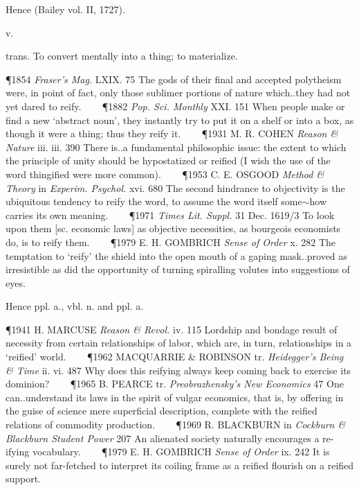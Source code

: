 \begin{description}[wide, labelwidth=!, labelindent=0pt]
\begin{myenumerate}
\noindent Hence  (Bailey vol. II, 1727).
\end{myenumerate}

 v.

\noindent {}

\vspace{-0.3cm}

trans. To convert mentally into a thing; to materialize.

\P 1854  \textit{Fraser's Mag.} LXIX. 75 The gods of their final and accepted polytheism were, in point of fact, only those sublimer portions of nature which..they had not yet dared to reify.    
\P 1882 \textit{Pop.  Sci. Monthly} XXI. 151 When people make or find a new ‘abstract noun’, they instantly try to put it on a shelf or into a box, as though it were a thing; thus they reify it.    
\P 1931 M. R. COHEN  \textit{Reason \& Nature} iii. iii. 390 There is..a fundamental philosophic issue: the extent to which the principle of unity should be hypostatized or reified (I wish the use of the word thingified were more common).    
\P 1953 C. E. OSGOOD  \textit{Method \& Theory} in \textit{Experim. Psychol.} xvi. 680 The second hindrance to objectivity is the ubiquitous tendency to reify the word, to assume the word itself some$\sim$how carries its own meaning.    
\P 1971  \textit{Times Lit. Suppl.} 31 Dec. 1619/3 To look upon them [sc. economic laws] as objective necessities, as bourgeois economists do, is to reify them.    
\P 1979 E. H. GOMBRICH  \textit{Sense of Order} x. 282 The temptation to ‘reify’ the shield into the open mouth of a gaping mask..proved as irresistible as did the opportunity of turning spiralling volutes into suggestions of eyes.

\noindent Hence  ppl. a.,  vbl. n. and ppl. a.

\P 1941 H. MARCUSE  \textit{Reason \& Revol.} iv. 115 Lordship and bondage result of necessity from certain relationships of labor, which are, in turn, relationships in a ‘reified’ world.    
\P 1962 MACQUARRIE \& ROBINSON tr.  \textit{Heidegger's Being \& Time} ii. vi. 487 Why does this reifying always keep coming back to exercise its dominion?    
\P 1965 B. PEARCE tr.  \textit{Preobrazhensky's New Economics} 47 One can..understand its laws in the spirit of vulgar economics, that is, by offering in the guise of science mere superficial description, complete with the reified relations of commodity production.    
\P 1969 R. BLACKBURN in  \textit{Cockburn \& Blackburn Student Power} 207 An alienated society naturally encourages a re-ifying vocabulary.    
\P 1979 E. H. GOMBRICH  \textit{Sense of Order} ix. 242 It is surely not far-fetched to interpret its coiling frame as a reified flourish on a reified support.




\end{description}
